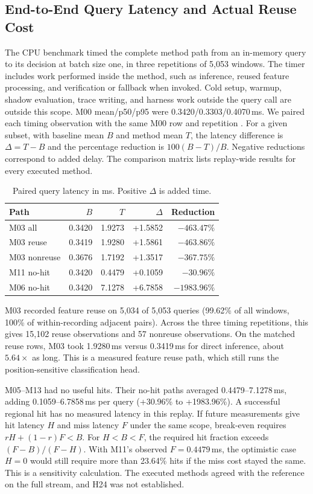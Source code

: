 \documentclass[journal]{IEEEtran}
\begin{document}
\subsection{End-to-End Query Latency and Actual Reuse Cost}
The CPU benchmark timed the complete method path from an in-memory query to its decision at batch size one, in three repetitions of 5,053 windows. The timer includes work performed inside the method, such as inference, reused feature processing, and verification or fallback when invoked. Cold setup, warmup, shadow evaluation, trace writing, and harness work outside the query call are outside this scope. M00 mean/p50/p95 were 0.3420/0.3303/0.4070\,ms. We paired each timing observation with the same M00 row and repetition \cite{localpaired}. For a given subset, with baseline mean $B$ and method mean $T$, the latency difference is $\Delta=T-B$ and the percentage reduction is $100(B-T)/B$. Negative reductions correspond to added delay. The comparison matrix lists replay-wide results for every executed method.
\begin{table}[t]
\caption{Paired query latency in ms. Positive $\Delta$ is added time.}
\label{tab:latency-paired}
\centering\small
\begin{tabular}{@{}lrrrr@{}}\toprule
Path & $B$ & $T$ & $\Delta$ & Reduction\\\midrule
M03 all & 0.3420 & 1.9273 & +1.5852 & $-463.47\%$\\
M03 reuse & 0.3419 & 1.9280 & +1.5861 & $-463.86\%$\\
M03 nonreuse & 0.3676 & 1.7192 & +1.3517 & $-367.75\%$\\
M11 no-hit & 0.3420 & 0.4479 & +0.1059 & $-30.96\%$\\
M06 no-hit & 0.3420 & 7.1278 & +6.7858 & $-1983.96\%$\\
\bottomrule\end{tabular}
\end{table}
\par
M03 recorded feature reuse on 5,034 of 5,053 queries (99.62\% of all windows, 100\% of within-recording adjacent pairs). Across the three timing repetitions, this gives 15,102 reuse observations and 57 nonreuse observations. On the matched reuse rows, M03 took 1.9280\,ms versus 0.3419\,ms for direct inference, about $5.64\times$ as long. This is a measured feature reuse path, which still runs the position-sensitive classification head.
\par
M05--M13 had no useful hits. Their no-hit paths averaged 0.4479--7.1278\,ms, adding 0.1059--6.7858\,ms per query (+30.96\% to +1983.96\%). A successful regional hit has no measured latency in this replay. If future measurements give hit latency $H$ and miss latency $F$ under the same scope, break-even requires $rH+(1-r)F<B$. For $H<B<F$, the required hit fraction exceeds $(F-B)/(F-H)$. With M11's observed $F=0.4479$\,ms, the optimistic case $H=0$ would still require more than 23.64\% hits if the miss cost stayed the same. This is a sensitivity calculation. The executed methods agreed with the reference on the full stream, and H24 was not established.
\end{document}
